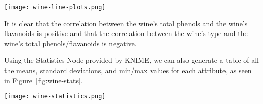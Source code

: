 \documentclass[
  coursecode={CISC/CMPE 251},
  assignmentname={Exercise 1},
  studentnumber=20053722,
  name={Bryan Hoang}
]{
  ltxanswer%
}
\begin{document}
\begin{questions}
\begin{solution}
      \begin{answerfigure}
        \captionsetup{type=figure}
        \texttt{[image: wine-line-plots.png]}
        \label{fig:wine-line-plots}
      \end{answerfigure}

      It is clear that the correlation between the wine's total phenols and the wine's flavanoids is positive and that the correlation between the wine's type and the wine's total phenols/flavanoids is negative.

      Using the Statistics Node provided by KNIME, we can also generate a table of all the means, standard deviations, and min/max values for each attribute, as seen in Figure~\ref{fig:wine-stats}.

      \newpage
      \begin{center}
        \captionsetup{type=figure}
        \texttt{[image: wine-statistics.png]}
        \label{fig:wine-stats}
      \end{center}
    \end{solution}
  \end{questions}
\end{document}
